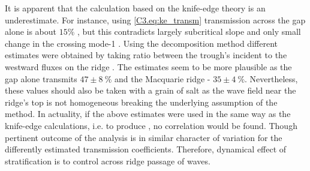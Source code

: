 \documentclass[12pt]{article}
\begin{document}
It is apparent that the calculation based on the knife-edge theory is an underestimate. For 
instance, using \eqref{C3.eq:ke_transm} transmission across the gap alone is about $15\%$ 
, but this contradicts largely subcritical slope and only small  
change in the crossing mode-1 . Using the decomposition method 
different estimates were obtained by taking ratio between the trough's incident to the westward 
fluxes on the 
ridge . The 
estimates seem to be more plausible as the gap alone transmits $47 \pm 8~\%$ and the Macquarie 
ridge - $35 \pm 4~\%$. Nevertheless, these values should also 
be taken with a grain of salt as the wave field near the ridge's top is not homogeneous breaking the 
underlying assumption of the method. In actuality, if the above estimates were used in the same way 
as the knife-edge calculations, i.e. to produce , no correlation 
would be found. Though pertinent outcome of the analysis is in similar character of variation for 
the differently estimated transmission coefficients. Therefore, dynamical effect of stratification 
is to control across ridge passage of waves.\\
\end{document}

